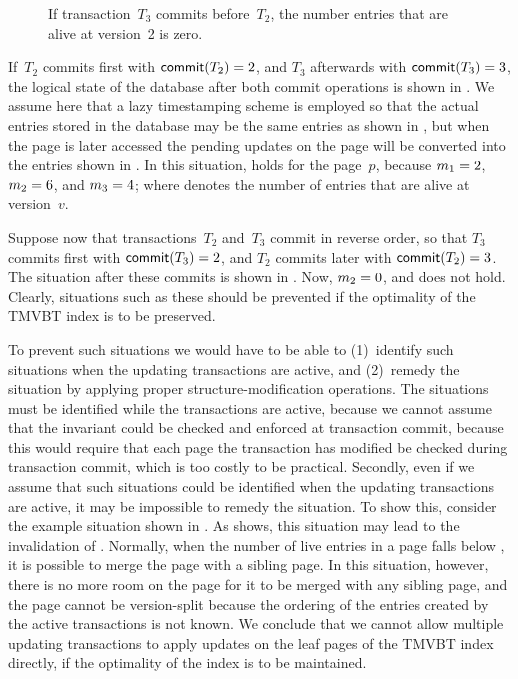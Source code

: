 \begin{figure}[!htb]
\begin{center}

%
{If transaction~$T_3$ commits before~$T_2$, the number entries that are alive
at version~\num{2} is zero.}
\label{fig:tmvbt:multi-update}
\end{center}
\end{figure}

If~$T_2$ commits first with $\text{\textsf{commit}}(T_2) = 2$, and
$T_3$ afterwards with $\text{\textsf{commit}}(T_3) = 3$, the logical
state of the database after both commit operations is shown in
. 
We assume here that a lazy timestamping scheme is employed so that the
actual entries stored in the database may be the same entries as shown in
, but when the page is
later accessed the pending updates on the page will be converted into the
entries shown in .
In this situation,  holds for the page~$p$,
because $m_{1} = 2$, $m_{2} = 6$, and $m_{3} = 4$; where
 denotes the number of entries that are alive at version~$v$.

Suppose now that transactions~$T_2$ and~$T_3$ commit in reverse order, so
that $T_3$ commits first with $\text{\textsf{commit}}(T_3) = 2$, and $T_2$ commits later
with $\text{\textsf{commit}}(T_2) = 3$. 
The situation after these commits is shown in
.
Now, $m_{2} = 0$, and  does not hold.
Clearly, situations such as these should be prevented if the optimality of the
TMVBT index is to be preserved.

To prevent such situations we would have to be able to (1)~identify such
situations when the updating transactions are active, and (2)~remedy the
situation by applying proper structure-modification operations.
The situations must be identified while the transactions are active, because
we cannot assume that the invariant could be checked and enforced at
transaction commit, because this would require that each page the transaction
has modified be checked during transaction commit, which is too costly to be
practical.
Secondly, even if we assume that such situations could be identified
when the updating transactions are active, it may be impossible to remedy the
situation.
To show this, consider the example situation shown in
.
As  shows, this situation may lead to
the invalidation of .
Normally, when the number of live entries in a page falls below \minlive, it
is possible to merge the page with a sibling page.
In this situation, however, there is no more room on the page for it to be
merged with any sibling page, and the page cannot be version-split because
the ordering of the entries created by the active transactions is not known.
We conclude that we cannot allow multiple updating transactions to apply
updates on the leaf pages of the TMVBT index directly, if the optimality of
the index is to be maintained.




